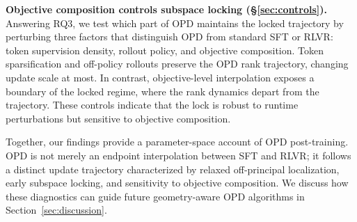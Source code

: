 \documentclass{llmxive}
\begin{document}
\textbf{Objective composition controls subspace locking
(\S\ref{sec:controls}).}
Answering RQ3, we test which part of OPD maintains the locked trajectory
by perturbing three factors that distinguish OPD from standard SFT or
RLVR: token supervision density, rollout policy, and objective composition.
Token sparsification and off-policy rollouts preserve the OPD rank
trajectory, changing update scale at most. In contrast, objective-level interpolation exposes a boundary of the locked regime, where the rank
dynamics depart from the trajectory. These controls indicate that the lock is robust to runtime perturbations but sensitive to objective composition.


Together, our findings provide a parameter-space account of OPD
post-training. OPD is not merely an endpoint interpolation between SFT and RLVR; it follows a distinct update trajectory characterized by relaxed off-principal localization, early subspace locking, and sensitivity to objective composition. We discuss how these diagnostics can guide future geometry-aware OPD algorithms in Section~\ref{sec:discussion}.


\end{document}
